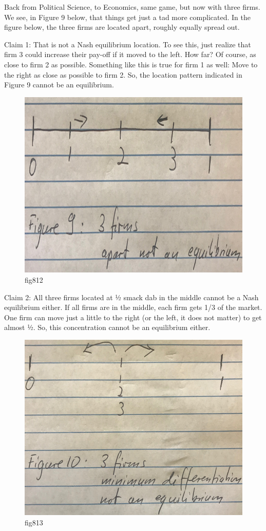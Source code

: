 \documentclass[
]{book}
\begin{document}
Back from Political Science, to Economics, same game, but now with three firms. We see, in Figure 9 below, that things get just a tad more complicated. In the figure below, the three firms are located apart, roughly equally spread out.

Claim 1: That is not a Nash equilibrium location. To see this, just realize that firm 3 could increase their pay-off if it moved to the left. How far? Of course, as close to firm 2 as possible. Something like this is true for firm 1 as well: Move to the right as close as possible to firm 2. So, the location pattern indicated in Figure 9 cannot be an equilibrium.

\begin{figure}

{\centering \includegraphics[width=0.5\linewidth]{img/ch8/fig12} 

}

\caption{fig812}\label{fig:fig812}
\end{figure}

Claim 2: All three firms located at ½ smack dab in the middle cannot be a Nash equilibrium either. If all firms are in the middle, each firm gets 1/3 of the market. One firm can move just a little to the right (or the left, it does not matter) to get almost ½. So, this concentration cannot be an equilibrium either.

\begin{figure}

{\centering \includegraphics[width=0.5\linewidth]{img/ch8/fig13} 

}

\caption{fig813}\label{fig:fig813}
\end{figure}
\end{document}
